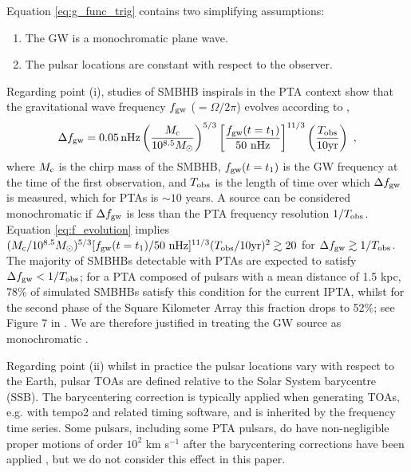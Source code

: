 \documentclass[fleqn,usenatbib,useAMS]{mnras}
\begin{document}
\noindent Equation \eqref{eq:g_func_trig} contains two simplifying assumptions: 
\begin{enumerate}[leftmargin=2em]
	\item The GW is a monochromatic plane wave.
	\item The pulsar locations are constant with respect to the observer.
\end{enumerate}
Regarding point (i), studies of SMBHB inspirals in the PTA context show that the gravitational wave frequency $f_{\rm gw}$ ($=\Omega / 2 \pi $) evolves according to \citep[e.g.][]{Sesana2010},
\begin{equation}
	\Delta f_{\rm gw} = 0.05 \, \mathrm{nHz}\left(\frac{M_{\rm c}}{10^{8.5} M_{\odot}}\right)^{5 / 3}\left[\frac{f_{\rm gw}(t=t_1)}{50 \mathrm{~nHz}}\right]^{11 / 3}\left(\frac{T_{\mathrm{obs}}}{10 \mathrm{yr}}\right) \ ,
	\label{eq:f_evolution}
\end{equation}
where $M_{\rm c}$ is the chirp mass of the SMBHB, $f_{\rm gw}(t=t_1)$ is the GW frequency at the time of the first observation, and $T_{\rm obs}$ is the length of time over which $\Delta f_{\rm gw}$ is measured, which for PTAs is $\sim 10$ years. A source can be considered monochromatic if $\Delta f_{\rm gw}$ is less than the PTA frequency resolution $1/T_{\rm obs}$. Equation \eqref{eq:f_evolution} implies $(M_{\rm c}/10^{8.5} M_{\odot})^{5/3} [ f_{\rm gw}(t=t_1) / 50 \mathrm{~nHz}]^{11/3} (T_{\rm obs}/10 \mathrm{yr})^2 \gtrsim 20$ for $\Delta f_{\rm gw} \gtrsim 1/T_{\rm obs}$. The majority of SMBHBs detectable with PTAs are expected to satisfy $\Delta f_{\rm gw} < 1/T_{\rm obs}$; for a PTA composed of pulsars with a mean distance of 1.5 kpc, 78\% of simulated SMBHBs satisfy this condition for the current IPTA, whilst for the second phase of the Square Kilometer Array this fraction drops to 52\%; see Figure 7 in  \cite{Rosado10.1093/mnras/stv1098}. We are therefore justified in treating the GW source as monochromatic \citep{Sesana10,Sesana2010,Ellis2012ApJ}. \newline 


Regarding point (ii) whilst in practice the pulsar locations vary with respect to the Earth, pulsar TOAs are defined relative to the Solar System barycentre (SSB). The barycentering correction is typically applied when generating TOAs, e.g. with {\sc tempo2} \citep{tempo2} and related timing software, and is inherited by the frequency time series. Some pulsars, including some PTA pulsars, do have non-negligible proper motions of order $10^2$ km s$^{-1}$ after the barycentering corrections have been applied \citep[e.g.][]{10.1093/mnras/sty3390}, but we do not consider this effect in this paper. 
\end{document}
